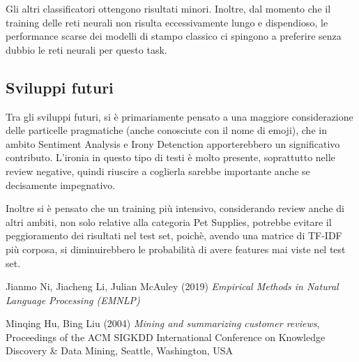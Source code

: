 \documentclass[fleqn,10pt]{SelfArx} %
\begin{document}
Gli altri classificatori ottengono risultati minori. Inoltre, dal momento che il training delle reti neurali non risulta eccessivamente lungo e dispendioso, le performance scarse dei modelli di stampo classico ci spingono a preferire senza dubbio le reti neurali per questo task.


\subsection{Sviluppi futuri}

Tra gli sviluppi futuri, si è primariamente  pensato a una maggiore considerazione delle particelle pragmatiche (anche conosciute con il nome di emoji), che in ambito Sentiment Analysis e Irony Detenction apporterebbero un significativo contributo. L'ironia in questo tipo di testi è molto presente, soprattutto nelle review negative, quindi riuscire a coglierla sarebbe importante anche se decisamente impegnativo. 

Inoltre si è pensato che un training più intensivo, considerando review anche di altri ambiti, non solo relative alla categoria Pet Supplies, potrebbe evitare il peggioramento dei risultati nel test set, poichè, avendo una matrice di TF-IDF più corposa, si diminuirebbero le probabilità di avere features mai viste nel test set.

\begin{thebibliography}{9}
Jianmo Ni, Jiacheng Li, Julian McAuley (2019) \emph{Empirical Methods in Natural Language Processing (EMNLP)}

Minqing Hu, Bing Liu (2004) \emph{Mining and summarizing customer reviews}, Proceedings of the ACM SIGKDD International Conference on Knowledge Discovery & Data Mining, Seattle, Washington, USA

\end{thebibliography}
\end{document}
